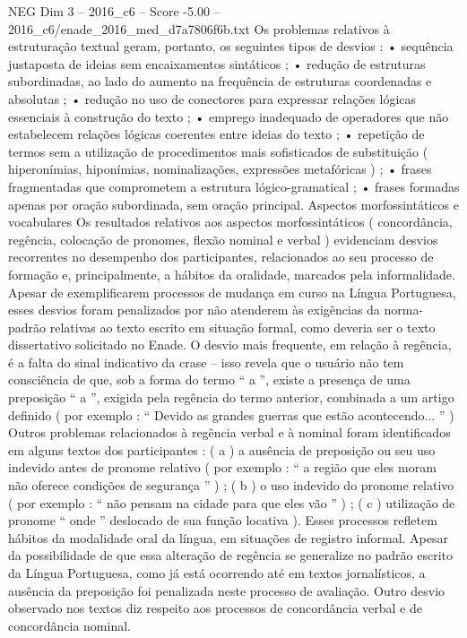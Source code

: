 \begin{textsample}{NEG Dim 3 – 2016\_c6 – Score -5.00 – 2016\_c6/enade\_2016\_med\_d7a7806f6b.txt}
Os problemas relativos à estruturação textual geram, portanto, os seguintes tipos de desvios : • sequência justaposta de ideias sem encaixamentos sintáticos ; • redução de estruturas subordinadas, ao lado do aumento na frequência de estruturas coordenadas e absolutas ; • redução no uso de conectores para expressar relações lógicas essenciais à construção do texto ; • emprego inadequado de operadores que não estabelecem relações lógicas coerentes entre ideias do texto ; • repetição de termos sem a utilização de procedimentos mais sofisticados de substituição ( hiperonímias, hiponímias, nominalizações, expressões metafóricas ) ; • frases fragmentadas que comprometem a estrutura lógico-gramatical ; • frases formadas apenas por oração subordinada, sem oração principal.
Aspectos morfossintáticos e vocabulares Os resultados relativos aos aspectos morfossintáticos ( concordância, regência, colocação de pronomes, flexão nominal e verbal ) evidenciam desvios recorrentes no desempenho dos participantes, relacionados ao seu processo de formação e, principalmente, a hábitos da oralidade, marcados pela informalidade.
Apesar de exemplificarem processos de mudança em curso na Língua Portuguesa, esses desvios foram penalizados por não atenderem às exigências da norma-padrão relativas ao texto escrito em situação formal, como deveria ser o texto dissertativo solicitado no Enade.
O desvio mais frequente, em relação à regência, é a falta do sinal indicativo da crase – isso revela que o usuário não tem consciência de que, sob a forma do termo “ a ”, existe a presença de uma preposição “ a ”, exigida pela regência do termo anterior, combinada a um artigo definido ( por exemplo : “ Devido as grandes guerras que estão acontecendo... ” ) Outros problemas relacionados à regência verbal e à nominal foram identificados em alguns textos dos participantes : ( a ) a ausência de preposição ou seu uso indevido antes de pronome relativo ( por exemplo : “ a região que eles moram não oferece condições de segurança ” ) ; ( b ) o uso indevido do pronome relativo ( por exemplo : “ não pensam na cidade para que eles vão ” ) ; ( c ) utilização de pronome “ onde ” deslocado de sua função locativa ).
Esses processos refletem hábitos da modalidade oral da língua, em situações de registro informal.
Apesar da possibilidade de que essa alteração de regência se generalize no padrão escrito da Língua Portuguesa, como já está ocorrendo até em textos jornalísticos, a ausência da preposição foi penalizada neste processo de avaliação.
Outro desvio observado nos textos diz respeito aos processos de concordância verbal e de concordância nominal.

\end{textsample}
